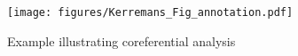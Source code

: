 \documentclass[output=paper]{langsci/langscibook.cls}
\begin{document}
\begin{figure}
\texttt{[image: figures/Kerremans\_Fig\_annotation.pdf]}
\caption{Example illustrating coreferential analysis}
\label{fig:k2}
\end{figure}


	 
\end{document}
